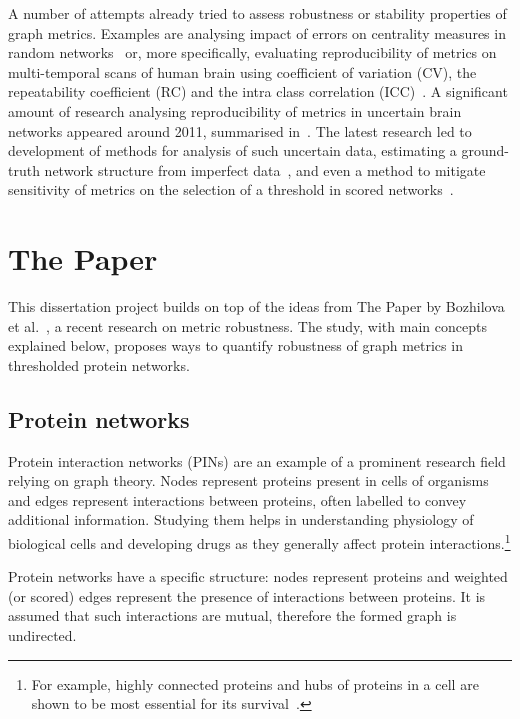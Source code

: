 A number of attempts already tried to assess robustness or stability properties of graph metrics.
Examples are analysing impact of errors on centrality measures in random networks~\cite{BorgattiRobustnessCentralityMeasures2006} or, more specifically, evaluating reproducibility of metrics on multi-temporal scans of human brain using coefficient of variation (CV), the repeatability coefficient (RC) and the intra class correlation (ICC)~\cite{VaessenEffectReproducibilityDifferent2010,DennisTestRetestReliabilityGraph2012}.
A significant amount of research analysing reproducibility of metrics in uncertain brain networks appeared around 2011, summarised in~\cite{TelesfordExplorationGraphMetric2013}.
The latest research led to development of methods for analysis of such uncertain data, estimating a ground-truth network structure from imperfect data~\cite{Martin2016,Newman2018}, and even a method to mitigate sensitivity of metrics on the selection of a threshold in scored networks~\cite{Drakesmith2015}.


\section{The Paper}

This dissertation project builds on top of the ideas from The Paper by Bozhilova et al.~\cite{Bozhilova2019}, a recent research on metric robustness.
The study, with main concepts explained below, proposes ways to quantify robustness of graph metrics in thresholded protein networks.

\subsection{Protein networks}

Protein interaction networks (PINs) are an example of a prominent research field relying on graph theory.
Nodes represent proteins present in cells of organisms and edges represent interactions between proteins, often labelled to convey additional information.
Studying them helps in understanding physiology of biological cells and developing drugs as they generally affect protein interactions.\footnote{For example, highly connected proteins and hubs of proteins in a cell are shown to be most essential for its survival~\cite{JeongLethalityCentralityProtein2001,HeWhyHubsTend2006}.}

Protein networks have a specific structure: nodes represent proteins and weighted (or scored) edges represent the presence of interactions between proteins.
It is assumed that such interactions are mutual, therefore the formed graph is undirected.

